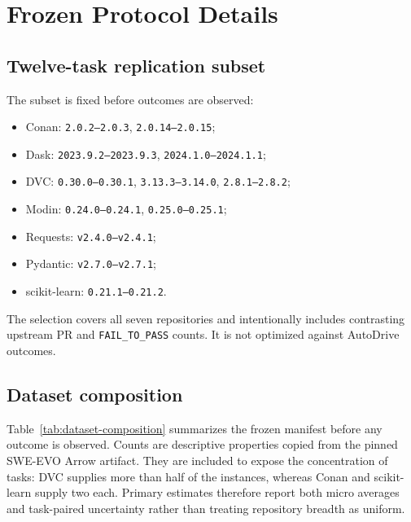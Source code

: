 \section{Frozen Protocol Details}

\subsection{Twelve-task replication subset}

The subset is fixed before outcomes are observed:

\begin{itemize}[leftmargin=*]
  \item Conan: \texttt{2.0.2--2.0.3}, \texttt{2.0.14--2.0.15};
  \item Dask: \texttt{2023.9.2--2023.9.3}, \texttt{2024.1.0--2024.1.1};
  \item DVC: \texttt{0.30.0--0.30.1}, \texttt{3.13.3--3.14.0}, \texttt{2.8.1--2.8.2};
  \item Modin: \texttt{0.24.0--0.24.1}, \texttt{0.25.0--0.25.1};
  \item Requests: \texttt{v2.4.0--v2.4.1};
  \item Pydantic: \texttt{v2.7.0--v2.7.1};
  \item scikit-learn: \texttt{0.21.1--0.21.2}.
\end{itemize}

The selection covers all seven repositories and intentionally includes contrasting upstream PR and \texttt{FAIL\_TO\_PASS} counts. It is not optimized against AutoDrive outcomes.

\subsection{Dataset composition}

Table~\ref{tab:dataset-composition} summarizes the frozen manifest before any outcome is observed. Counts are descriptive properties copied from the pinned SWE-EVO Arrow artifact. They are included to expose the concentration of tasks: DVC supplies more than half of the instances, whereas Conan and scikit-learn supply two each. Primary estimates therefore report both micro averages and task-paired uncertainty rather than treating repository breadth as uniform.

